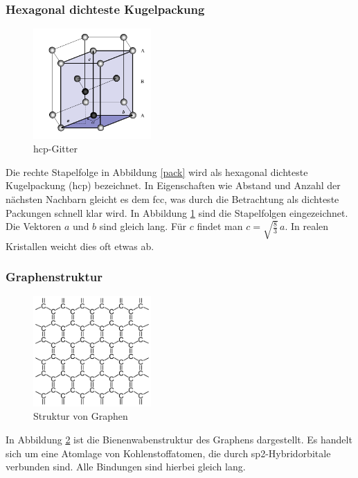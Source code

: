         \subsubsection{Hexagonal dichteste Kugelpackung}

\begin{figure}
    \centering
    \includegraphics[width=0.4\textwidth]{Abb/hcp.png}
    \caption{hcp-Gitter \cite{hunklinger}}
    \label{hcp}
\end{figure}
Die rechte Stapelfolge in Abbildung \ref{pack} wird als hexagonal dichteste
Kugelpackung (hcp) bezeichnet. In Eigenschaften wie Abstand und Anzahl der nächsten
Nachbarn gleicht es dem fcc, was durch die Betrachtung als dichteste Packungen 
schnell klar wird. In Abbildung \ref{hcp} sind die Stapelfolgen eingezeichnet.
Die Vektoren $a$ und $b$ sind gleich lang. Für $c$ findet man $c = \sqrt{ 
\frac{8}{3}} \, a$. In realen Kristallen weicht dies oft etwas ab.

        \subsubsection{Graphenstruktur}

\begin{figure}
    \centering
    \includegraphics[width=0.4\textwidth]{Abb/graphenstruktur.pdf}
    \caption{Struktur von Graphen \cite{wikigraphen}}
    \label{graphenstruktur}
\end{figure}
In Abbildung \ref{graphenstruktur} ist die Bienenwabenstruktur des Graphens 
dargestellt. Es handelt sich um eine Atomlage von Kohlenstoffatomen, die durch
sp2-Hybridorbitale verbunden sind. Alle Bindungen sind hierbei gleich lang.
\cite{hunklinger}

